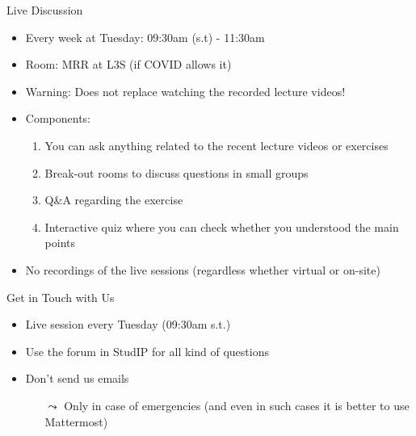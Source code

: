 \documentclass[aspectratio=169]{../latex_main/tntbeamer}  %
\begin{document}
\begin{frame}[c]{Live Discussion}

\begin{itemize}
  \item Every week at Tuesday: 09:30am (s.t) - 11:30am\\ 
  \item Room: MRR at L3S (if COVID allows it)
  \pause
  \item Warning: Does not replace watching the recorded lecture videos!
  \pause
  \smallskip
  \item Components:
  \begin{enumerate}
       \item You can ask anything related to the recent lecture videos or exercises
      \item Break-out rooms to discuss questions in small groups
      \pause
      \item Q\&A regarding the exercise
      \pause
      \item Interactive quiz where you can check whether you understood the main points
  \end{enumerate}
  \pause
  \medskip
  \item No recordings of the live sessions (regardless whether virtual or on-site)
\end{itemize}

\end{frame}
\begin{frame}[c]{Get in Touch with Us}

\begin{itemize}
  \item Live session every Tuesday (09:30am s.t.)
  \item Use the forum in StudIP for all kind of questions
  \item Don't send us emails
  \begin{itemize}
      \item[$\leadsto$] Only in case of emergencies (and even in such cases it is better to use Mattermost) 
  \end{itemize}
\end{itemize}

\end{frame}
\end{document}
